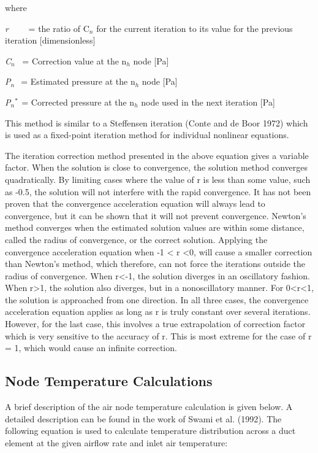 where

\emph{r}~~~~ = the ratio of C\(_{n}\) for the current iteration to its value for the previous iteration {[}dimensionless{]}

\emph{C\(_{n}\)}~ = Correction value at the n\(_{h}\) node {[}Pa{]}

\emph{P\(_{n}\)} \(_{ }\) = Estimated pressure at the n\(_{h}\) node {[}Pa{]}

\emph{P\(_{n}\)\(^{*}\)}\(_{ }\) = Corrected pressure at the n\(_{h}\) node used in the next iteration {[}Pa{]}

This method is similar to a Steffensen iteration (Conte and de Boor 1972) which is used as a fixed-point iteration method for individual nonlinear equations.

The iteration correction method presented in the above equation gives a variable factor. When the solution is close to convergence, the solution method converges quadratically. By limiting cases where the value of r is less than some value, such as -0.5, the solution will not interfere with the rapid convergence. It has not been proven that the convergence acceleration equation will always lead to convergence, but it can be shown that it will not prevent convergence. Newton's method converges when the estimated solution values are within some distance, called the radius of convergence, or the correct solution. Applying the convergence acceleration equation when -1 \textless{} r \textless{}0, will cause a smaller correction than Newton's method, which therefore, can not force the iterations outside the radius of convergence. When r\textless{}-1, the solution diverges in an oscillatory fashion. When r\textgreater{}1, the solution also diverges, but in a nonoscillatory manner. For 0\textless{}r\textless{}1, the solution is approached from one direction. In all three cases, the convergence acceleration equation applies as long as r is truly constant over several iterations. However, for the last case, this involves a true extrapolation of correction factor which is very sensitive to the accuracy of r. This is most extreme for the case of r = 1, which would cause an infinite correction.

\subsection{Node Temperature Calculations}\label{node-temperature-calculations}

A brief description of the air node temperature calculation is given below. A detailed description can be found in the work of Swami et al. (1992). The following equation is used to calculate temperature distribution across a duct element at the given airflow rate and inlet air temperature:

